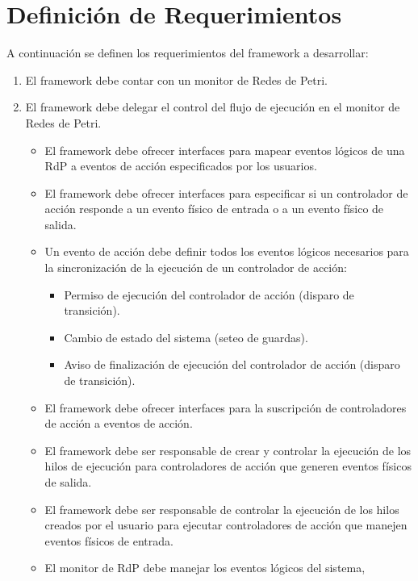 \section{Definición de Requerimientos}
A continuación se definen los requerimientos del framework a desarrollar:
\begin{enumerate}
    \item El framework debe contar con un monitor de Redes de Petri.
    \item El framework debe delegar el control del flujo de ejecución en el
    monitor de Redes de Petri.
        \begin{itemize}
            \item El framework debe ofrecer interfaces para mapear eventos lógicos
            de una RdP a eventos de acción especificados por los usuarios.
            \item El framework debe ofrecer interfaces para especificar si un
            controlador de acción responde a un evento físico de entrada o a un
            evento físico de salida.
            \item Un evento de acción debe definir todos los eventos lógicos
            necesarios para la sincronización de la ejecución de un controlador de
            acción:
                \begin{itemize}
                  \item Permiso de ejecución del controlador de acción (disparo de
                  transición).
                  \item Cambio de estado del sistema (seteo de guardas).
                  \item Aviso de finalización de ejecución del controlador de acción
                  (disparo de transición).
                \end{itemize}
            \item El framework debe ofrecer interfaces para la suscripción de
            controladores de acción a eventos de acción.
            \item El framework debe ser responsable de crear y controlar la
            ejecución de los hilos de ejecución para controladores de acción que
            generen eventos físicos de salida.
            \item El framework debe ser responsable de controlar la ejecución de los
            hilos creados por el usuario para ejecutar controladores de acción que
            manejen eventos físicos de entrada.
            \item El monitor de RdP debe manejar los eventos lógicos del sistema,

\end{itemize}
\end{enumerate}
